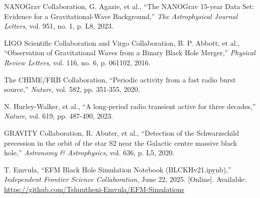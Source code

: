 \documentclass[11pt, twoside]{article}
\begin{document}

\begin{thebibliography}{9}
\raggedright

NANOGrav Collaboration, G. Agazie, et al., ``The NANOGrav 15-year Data Set: Evidence for a Gravitational-Wave Background,'' \textit{The Astrophysical Journal Letters}, vol. 951, no. 1, p. L8, 2023.

LIGO Scientific Collaboration and Virgo Collaboration, B. P. Abbott, et al., ``Observation of Gravitational Waves from a Binary Black Hole Merger,'' \textit{Physical Review Letters}, vol. 116, no. 6, p. 061102, 2016.

The CHIME/FRB Collaboration, ``Periodic activity from a fast radio burst source,'' \textit{Nature}, vol. 582, pp. 351-355, 2020.

N. Hurley-Walker, et al., ``A long-period radio transient active for three decades,'' \textit{Nature}, vol. 619, pp. 487-490, 2023.

GRAVITY Collaboration, R. Abuter, et al., ``Detection of the Schwarzschild precession in the orbit of the star S2 near the Galactic centre massive black hole,'' \textit{Astronomy \& Astrophysics}, vol. 636, p. L5, 2020.

T. Emvula, ``EFM Black Hole Simulation Notebook (BLCKHv21.ipynb),'' \textit{Independent Frontier Science Collaboration}, June 22, 2025. [Online]. Available: \url{https://github.com/Tshuutheni-Emvula/EFM-Simulations}

\end{thebibliography}
\end{document}
